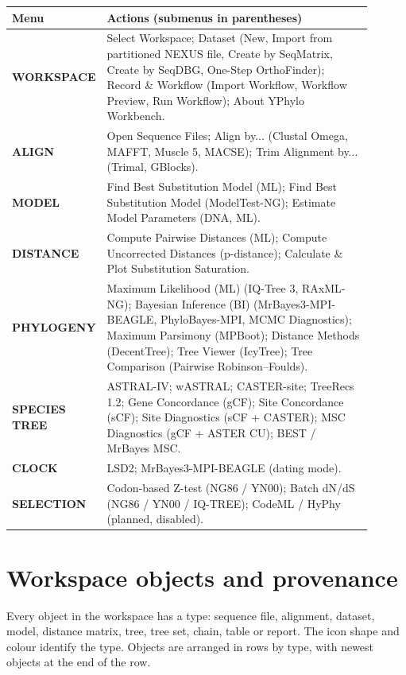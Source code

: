 \documentclass[10pt]{report}
\begin{document}
\begin{longtable}{@{}>{\raggedright\arraybackslash}p{0.15\linewidth}
                      >{\raggedright\arraybackslash}p{0.75\linewidth}@{}}
\toprule
Menu & Actions (submenus in parentheses) \\
\midrule
\endhead
\textbf{WORKSPACE} & Select Workspace; Dataset (New, Import from partitioned
NEXUS file, Create by SeqMatrix, Create by SeqDBG, One-Step OrthoFinder);
Record \& Workflow (Import Workflow, Workflow Preview, Run Workflow); About
YPhylo Workbench. \\
\textbf{ALIGN} & Open Sequence Files; Align by... (Clustal Omega, MAFFT,
Muscle 5, MACSE); Trim Alignment by... (Trimal, GBlocks). \\
\textbf{MODEL} & Find Best Substitution Model (ML); Find Best Substitution
Model (ModelTest-NG); Estimate Model Parameters (DNA, ML). \\
\textbf{DISTANCE} & Compute Pairwise Distances (ML); Compute Uncorrected
Distances (p-distance); Calculate \& Plot Substitution Saturation. \\
\textbf{PHYLOGENY} & Maximum Likelihood (ML) (IQ-Tree 3, RAxML-NG); Bayesian
Inference (BI) (MrBayes3-MPI-BEAGLE, PhyloBayes-MPI, MCMC Diagnostics);
Maximum Parsimony (MPBoot); Distance Methods (DecentTree); Tree Viewer
(IcyTree); Tree Comparison (Pairwise Robinson--Foulds). \\
\textbf{SPECIES TREE} & ASTRAL-IV; wASTRAL; CASTER-site; TreeRecs 1.2; Gene
Concordance (gCF); Site Concordance (sCF); Site Diagnostics (sCF + CASTER);
MSC Diagnostics (gCF + ASTER CU); BEST / MrBayes MSC. \\
\textbf{CLOCK} & LSD2; MrBayes3-MPI-BEAGLE (dating mode). \\
\textbf{SELECTION} & Codon-based Z-test (NG86 / YN00); Batch dN/dS (NG86 /
YN00 / IQ-TREE); CodeML / HyPhy (planned, disabled). \\
\bottomrule
\end{longtable}

\section{Workspace objects and provenance}

Every object in the workspace has a type: sequence file, alignment, dataset,
model, distance matrix, tree, tree set, chain, table or report. The icon shape
and colour identify the type. Objects are arranged in rows by type, with
newest objects at the end of the row.
\end{document}
